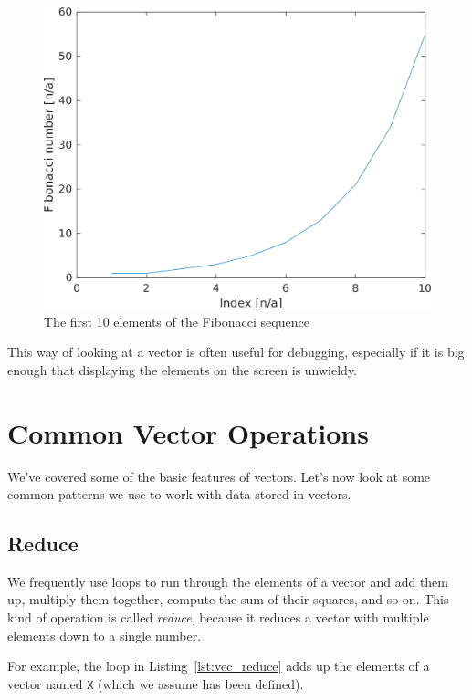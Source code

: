 \begin{figure}[h]
\centerline{\includegraphics[scale=0.7]{images/figure04_fib}}
\caption{The first 10 elements of the Fibonacci sequence}
\label{fig:fibonacci}
\end{figure}

This way of looking at a vector is often useful for debugging, especially
if it is big enough that displaying the elements on
the screen is unwieldy.


\section{Common Vector Operations}

We've covered some of the basic features of vectors. Let's now look at some common patterns we use to work with data stored in vectors.

\subsection{Reduce}
\label{reduce}

We frequently use loops to run through the elements of a vector
and add them up, multiply them together, compute the sum
of their squares, and so on.  This kind of operation is called \emph{reduce},
because it reduces a vector with multiple elements down to a single
number.


For example, the loop in Listing~\ref{lst:vec_reduce} adds up the elements of a vector named \lstinline{X} (which we assume has been defined).

